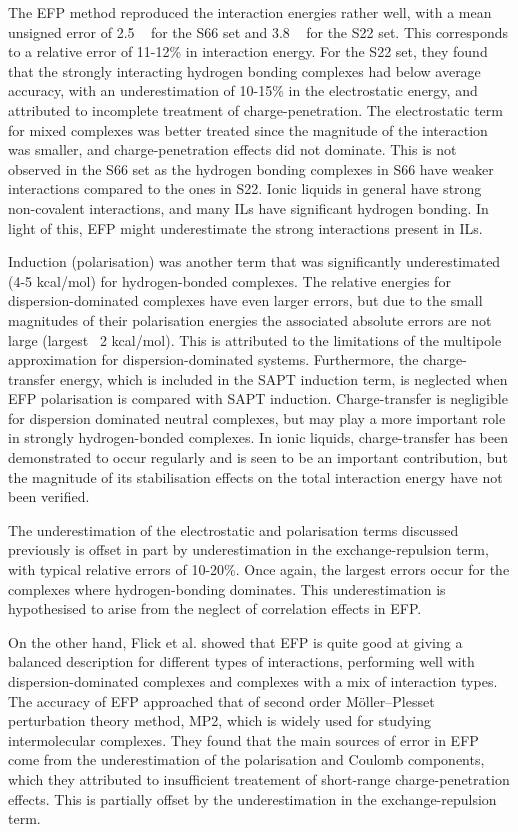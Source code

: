 The EFP method reproduced the interaction energies rather well, with a mean unsigned error of 2.5 \enUnit~ for the S66 set and 3.8 \enUnit~ for the S22 set.
This corresponds to a relative error of 11-12\% in interaction energy.
For the S22 set, they found that the strongly interacting hydrogen bonding complexes had below average accuracy, with an underestimation of 10-15\% in the electrostatic energy, and attributed to incomplete treatment of charge-penetration.
The electrostatic term for mixed complexes was better treated since the magnitude of the interaction was smaller, and charge-penetration effects did not dominate.
This is not observed in the S66 set as the hydrogen bonding complexes in S66 have weaker interactions compared to the ones in S22.
Ionic liquids in general have strong non-covalent interactions, and many ILs have significant hydrogen bonding.
In light of this, EFP might underestimate the strong interactions present in ILs.


Induction (polarisation) was another term that was significantly underestimated (4-5 kcal/mol) for hydrogen-bonded complexes.
The relative energies for dispersion-dominated complexes have even larger errors, but due to the small magnitudes of their polarisation energies the associated absolute errors are not large (largest ~2 kcal/mol).
This is attributed to the limitations of the multipole approximation for dispersion-dominated systems.
Furthermore, the charge-transfer energy, which is included in the SAPT induction term, is neglected when EFP polarisation is compared with SAPT induction.
Charge-transfer is negligible for dispersion dominated neutral complexes, but may play a more important role in strongly hydrogen-bonded complexes.
In ionic liquids, charge-transfer has been demonstrated to occur regularly and is seen to be an important contribution,
\cite{Izgorodina2011a}
but the magnitude of its stabilisation effects on the total interaction energy have not been verified.

The underestimation of the electrostatic and polarisation terms discussed previously is offset in part by underestimation in the exchange-repulsion term, with typical relative errors of 10-20\%.
Once again, the largest errors occur for the complexes where hydrogen-bonding dominates.
This underestimation is hypothesised to arise from the neglect of correlation effects in EFP.


On the other hand, Flick et al. showed that EFP is quite good at giving a balanced description for different types of interactions, performing well with dispersion-dominated complexes and complexes with a mix of interaction types.
The accuracy of EFP approached that of second order M\"{o}ller--Plesset perturbation theory method, MP2, which is widely used for studying intermolecular complexes.
They found that the main sources of error in EFP come from the underestimation of the polarisation and Coulomb components, which they attributed to insufficient treatement of short-range charge-penetration effects.
This is partially offset by the underestimation in the exchange-repulsion term.

